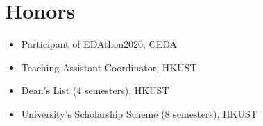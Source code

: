 \documentclass{mycv}
\begin{document}
\section{Honors}


\begin{itemize}
  \item Participant of EDAthon2020, CEDA 
  \item Teaching Assistant Coordinator, HKUST 
  \item Dean's List (4 semesters), HKUST
  \item University's Scholarship Scheme (8 semesters), HKUST
\end{itemize}
%
%
%
%
\end{document}
